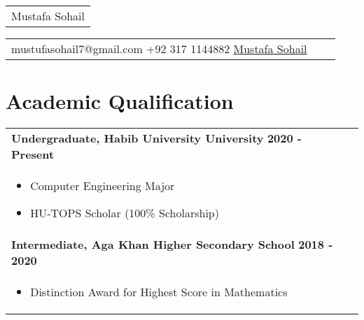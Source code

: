 \documentclass[a4paper,8pt]{article}
\begin{document}
\pagestyle{empty} 

\begin{tabularx}{\linewidth}{@{} C @{}}
\Huge{Mustafa Sohail} \\[6pt]
\end{tabularx}

\begin{tabularx}{\linewidth}{@{} C @{} C @{} C}
{{\raisebox{-0.05\height}{\faEnvelope} mustufasohail7@gmail.com}} 
{{\raisebox{-0.05\height}{\faMobile} +92 317 1144882}} 
{{\href{https://www.linkedin.com/in/mustafa-sohail-187ab4206/}{\raisebox{-0.05\height}{\faLinkedin} Mustafa Sohail}}}
{{\href{https://github.com/Mustafasohail7}{}}}
\end{tabularx}

\section{\textbf{Academic Qualification}}
\begin{tabularx}{\linewidth}{ @{}l r@{}}
\textbf{Undergraduate, Habib University University} \hfill \textbf{2020 - Present} \\[4pt]
\begin{minipage}[t]{\linewidth}
    \begin{itemize}[nosep, after=\strut, leftmargin=1em, itemsep=2pt]
        \item Computer Engineering Major
        \item HU-TOPS Scholar (100\% Scholarship)
    \end{itemize}
\end{minipage} \\[4pt]


\textbf{Intermediate, Aga Khan Higher Secondary School} \hfill \textbf{2018 - 2020}\\[4pt]
\begin{minipage}[t]{\linewidth}
    \begin{itemize}[nosep, after=\strut, leftmargin=1em, itemsep=2pt]
        \item Distinction Award for Highest Score in Mathematics
    \end{itemize}
\end{minipage}
\end{tabularx}

\end{document}
